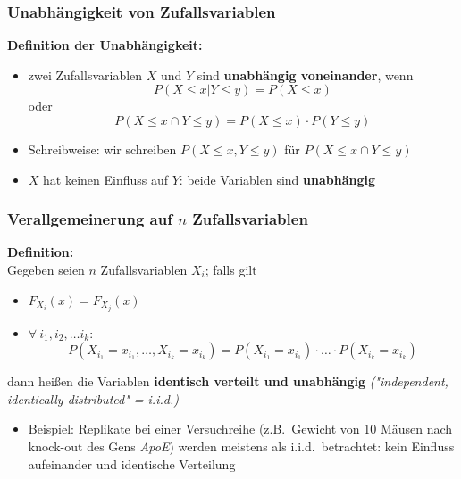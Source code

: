 \begin{frame}
    \frametitle{Unabhängigkeit von Zufallsvariablen}

    {\bf Definition der Unabhängigkeit:}\\

    \begin{itemize}
    \item zwei Zufallsvariablen $X$ und $Y$ sind {\bf unabhängig voneinander}, wenn
        $$
        P(X \le x | Y \le y) = P(X\le x) 
        $$
        oder
        $$
        P(X \le x \cap  Y \le y) = P(X \le x)\cdot P(Y \le y)
        $$
        \item Schreibweise: wir schreiben $P(X \le x , Y \le y)$ für $P(X \le x \cap  Y \le y)$

        \item $X$ hat keinen Einfluss auf $Y$: beide Variablen sind {\bf unabhängig}
    \end{itemize}
 
    

\end{frame}



\begin{frame}
    \frametitle{Verallgemeinerung auf $n$ Zufallsvariablen}

    {\bf Definition:}\\
    Gegeben seien $n$ Zufallsvariablen $X_i$; falls gilt
    \begin{itemize}
        \item $F_{X_i}(x) = F_{X_j}(x)$
        \item $\forall~i_{1},i_{2},\ldots i_{k}:$ 
        $$
        P(X_{i_1}=x_{i_1},\ldots,X_{i_k}=x_{i_k}) = P(X_{i_1}=x_{i_1})\cdot \ldots \cdot P(X_{i_k}=x_{i_k})
        $$
    \end{itemize}
    dann heißen die Variablen {\bf identisch verteilt und unabhängig} {\em ("independent, identically distributed" = i.i.d.)}
\begin{itemize}
    \item Beispiel: Replikate bei einer Versuchreihe (z.B.\ Gewicht von 10 Mäusen nach knock-out des Gens {\em ApoE}) werden meistens als i.i.d.\ betrachtet: kein Einfluss aufeinander und identische Verteilung
\end{itemize}
    
\end{frame}


